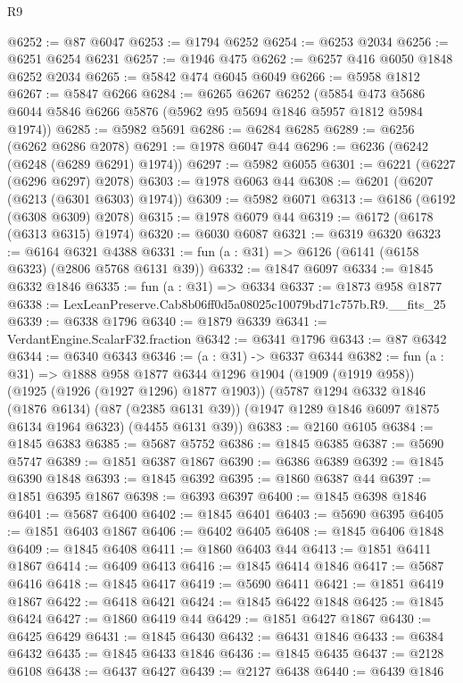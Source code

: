 \begin{lexlean}{R9}
\begin{coremodule}
@6252 := @87 @6047
@6253 := @1794 @6252
@6254 := @6253 @2034
@6256 := @6251 @6254 @6231
@6257 := @1946 @475
@6262 := @6257 @416 @6050 @1848 @6252 @2034
@6265 := @5842 @474 @6045 @6049
@6266 := @5958 @1812
@6267 := @5847 @6266
@6284 := @6265
    @6267
    @6252
    (@5854 @473 @5686 @6044 @5846 @6266 @5876 (@5962 @95 @5694 @1846 @5957 @1812 @5984 @1974))
@6285 := @5982 @5691
@6286 := @6284 @6285
@6289 := @6256 (@6262 @6286 @2078)
@6291 := @1978 @6047 @44
@6296 := @6236 (@6242 (@6248 (@6289 @6291) @1974))
@6297 := @5982 @6055
@6301 := @6221 (@6227 (@6296 @6297) @2078)
@6303 := @1978 @6063 @44
@6308 := @6201 (@6207 (@6213 (@6301 @6303) @1974))
@6309 := @5982 @6071
@6313 := @6186 (@6192 (@6308 @6309) @2078)
@6315 := @1978 @6079 @44
@6319 := @6172 (@6178 (@6313 @6315) @1974)
@6320 := @6030 @6087
@6321 := @6319 @6320
@6323 := @6164 @6321 @4388
@6331 := fun (a : @31) => @6126 (@6141 (@6158 @6323) (@2806 @5768 @6131 @39))
@6332 := @1847 @6097
@6334 := @1845 @6332 @1846
@6335 := fun (a : @31) => @6334
@6337 := @1873 @958 @1877
@6338 := LexLeanPreserve.Cab8b06ff0d5a08025c10079bd71c757b.R9.__fits_25
@6339 := @6338 @1796
@6340 := @1879 @6339
@6341 := VerdantEngine.ScalarF32.fraction
@6342 := @6341 @1796
@6343 := @87 @6342
@6344 := @6340 @6343
@6346 := (a : @31) -> @6337 @6344
@6382 := fun (a : @31) =>
  @1888
    @958
    @1877
    @6344
    @1296
    @1904
    (@1909 (@1919 @958))
    (@1925 (@1926 (@1927 @1296) @1877 @1903))
    (@5787
      @1294
      @6332
      @1846
      (@1876 @6134)
      (@87 (@2385 @6131 @39))
      (@1947 @1289 @1846 @6097 @1875 @6134 @1964 @6323)
      (@4455 @6131 @39))
@6383 := @2160 @6105
@6384 := @1845 @6383
@6385 := @5687 @5752
@6386 := @1845 @6385
@6387 := @5690 @5747
@6389 := @1851 @6387 @1867
@6390 := @6386 @6389
@6392 := @1845 @6390 @1848
@6393 := @1845 @6392
@6395 := @1860 @6387 @44
@6397 := @1851 @6395 @1867
@6398 := @6393 @6397
@6400 := @1845 @6398 @1846
@6401 := @5687 @6400
@6402 := @1845 @6401
@6403 := @5690 @6395
@6405 := @1851 @6403 @1867
@6406 := @6402 @6405
@6408 := @1845 @6406 @1848
@6409 := @1845 @6408
@6411 := @1860 @6403 @44
@6413 := @1851 @6411 @1867
@6414 := @6409 @6413
@6416 := @1845 @6414 @1846
@6417 := @5687 @6416
@6418 := @1845 @6417
@6419 := @5690 @6411
@6421 := @1851 @6419 @1867
@6422 := @6418 @6421
@6424 := @1845 @6422 @1848
@6425 := @1845 @6424
@6427 := @1860 @6419 @44
@6429 := @1851 @6427 @1867
@6430 := @6425 @6429
@6431 := @1845 @6430
@6432 := @6431 @1846
@6433 := @6384 @6432
@6435 := @1845 @6433 @1846
@6436 := @1845 @6435
@6437 := @2128 @6108
@6438 := @6437 @6427
@6439 := @2127 @6438
@6440 := @6439 @1846

\end{coremodule}
\end{lexlean}
